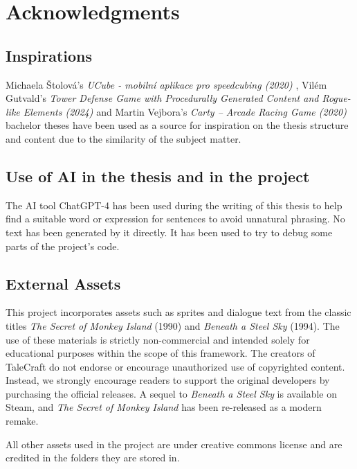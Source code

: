 \chapter{Acknowledgments}

\section{Inspirations}
Michaela Štolová's \textit{UCube - mobilní aplikace pro speedcubing (2020)} \cite{Stolova2020}, Vilém Gutvald's \textit{Tower Defense Game with Procedurally Generated Content and Rogue-like Elements (2024)} \cite{Gutvald2024} and Martin Vejbora's \textit{Carty – Arcade Racing Game (2020)} \cite{Vejbora2020} bachelor theses have been used as a source for inspiration on the thesis structure and content due to the similarity of the subject matter.

\section{Use of AI in the thesis and in the project}
The AI tool ChatGPT-4 has been used during the writing of this thesis to help find a suitable word or expression for sentences to avoid unnatural phrasing. No text has been generated by it directly. It has been used to try to debug some parts of the project's code.

\section{External Assets}
This project incorporates assets such as sprites and dialogue text from the classic titles \textit{The Secret of Monkey Island} (1990) and \textit{Beneath a Steel Sky} (1994). The use of these materials is strictly non-commercial and intended solely for educational purposes within the scope of this framework. The creators of TaleCraft do not endorse or encourage unauthorized use of copyrighted content. Instead, we strongly encourage readers to support the original developers by purchasing the official releases. A sequel to \textit{Beneath a Steel Sky} is available on Steam, and \textit{The Secret of Monkey Island} has been re-released as a modern remake. 

All other assets used in the project are under creative commons license and are credited in the folders they are stored in.  